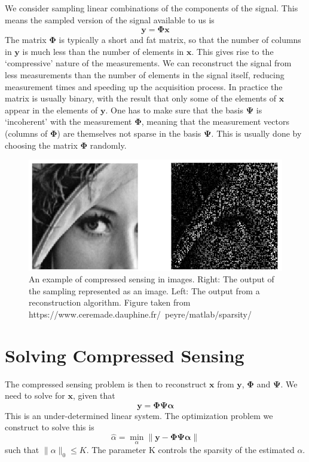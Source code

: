 \documentclass[letterpaper, 10 pt, conference]{article}
\begin{document}
We consider sampling linear combinations of the components of the signal. This means the sampled version of the signal available to us is 
$$\mathbf{y} = \mathbf{\Phi x}$$
The matrix $\mathbf{\Phi}$ is typically a short and fat matrix, so that the number of columns in $\mathbf{y}$ is much less than the number of elements in $\mathbf{x}$. This gives rise to the `compressive' nature of the measurements. We can reconstruct the signal from less measurements than the number of elements in the signal itself, reducing measurement times and speeding up the acquisition process. In practice the matrix is usually binary, with the result that only some of the elements of $\mathbf{x}$ appear in the elements of $\mathbf{y}$. One has to make sure that the basis $\mathbf{\Psi}$ is `incoherent' with the measurement $\mathbf{\Phi}$, meaning that the measurement vectors (columns of $\mathbf{\Phi}$) are themselves not sparse in the basis $\mathbf{\Psi}$. This is usually done by choosing the matrix $\mathbf{\Phi}$ randomly.

\begin{figure}[thpb]
      \centering
      \includegraphics[scale=0.5]{cs-example}
      \caption{An example of compressed sensing in images. Right: The output of the sampling represented as an image. Left: The output from a reconstruction algorithm. Figure taken from https://www.ceremade.dauphine.fr/~peyre/matlab/sparsity/}
      \label{figurelabel}
\end{figure}

\section{Solving Compressed Sensing}

The compressed sensing problem is then to reconstruct $\mathbf{x}$ from $\mathbf{y}$, $\mathbf{\Phi}$ and $\mathbf{\Psi}$. We need to solve for $\mathbf{x}$, given that $$\mathbf{y} = \mathbf{\Phi \Psi \alpha}$$ This is an under-determined linear system. The optimization problem we construct to solve this is
$$\hat{\alpha} = \min_\alpha \|\mathbf{y} - \mathbf{\Phi \Psi \alpha}\|$$
such that $\|\alpha\|_0 \leq K$. The parameter K controls the sparsity of the estimated $\alpha$.
\end{document}

